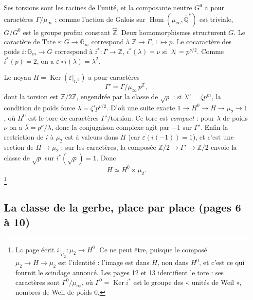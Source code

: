 \documentclass[11pt,a4paper]{article}
\begin{document}
Ses torsions sont les racines de l'unité, et la composante neutre $G^{0}$ a
pour caractères $\Gamma/\mu_{\infty}$ ; comme l'action de Galois sur
$\operatorname{Hom}(\mu_{\infty}, \overline{\mathbb{Q}}^{*})$ est triviale,
$G/G^{0}$ est le groupe profini constant $\widehat{\mathbb{Z}}$. Deux
homomorphismes structurent $G$. Le caractère de Tate
$\varepsilon \colon G \to \mathbb{G}_{m}$ correspond à $\mathbb{Z} \to \Gamma$,
$1 \mapsto p$. Le cocaractère des poids $i \colon \mathbb{G}_{m} \to G$
correspond à $i^{*} \colon \Gamma \to \mathbb{Z}$, $i^{*}(\lambda) = \nu$ si
$|\lambda| = p^{\nu/2}$. Comme $i^{*}(p) = 2$, on a
$\varepsilon \circ i (\lambda) = \lambda^{2}$.

Le noyau $H = \operatorname{Ker}(\varepsilon|_{G^{0}})$ a pour caractères
\[
  \Gamma' = \Gamma / \mu_{\infty}\, p^{\mathbb{Z}} ,
\]
dont la torsion est $\mathbb{Z}/2\mathbb{Z}$, engendrée par la classe de
$\sqrt{p}$ : si $\lambda^{n} = \zeta p^{m}$, la condition de poids force
$\lambda = \zeta' p^{\nu/2}$. D'où une suite exacte $1 \to H^{0} \to H \to
\mu_{2} \to 1$, où $H^{0}$ est le tore de caractères $\Gamma'/\text{torsion}$.
Ce tore est \emph{compact} : pour $\lambda$ de poids $\nu$ on a $\bar{\lambda} =
p^{\nu}/\lambda$, donc la conjugaison complexe agit par $-1$ sur $\Gamma'$.
Enfin la restriction de $i$ à $\mu_{2}$ est à valeurs dans $H$ (car
$\varepsilon(i(-1)) = 1$), et c'est une section de $H \to \mu_{2}$ : sur les
caractères, la composée $\mathbb{Z}/2 \to \Gamma' \to \mathbb{Z}/2$ envoie la
classe de $\sqrt{p}$ sur $i^{*}(\sqrt{p}) = 1$. Donc
\[
  H \simeq H^{0} \times \mu_{2} .
\]
\footnote{La page écrit $i|_{\mu_{2}} \colon \mu_{2} \to H^{0}$. Ce ne peut être,
puisque le composé $\mu_{2} \to H \to \mu_{2}$ est l'identité : l'image est dans
$H$, non dans $H^{0}$, et c'est ce qui fournit le scindage annoncé. Les pages 12
et 13 identifient le tore : ses caractères sont $\Gamma^{0}/\mu_{\infty}$, où
$\Gamma^{0} = \operatorname{Ker} i^{*}$ est le groupe des « unités de Weil »,
nombres de Weil de poids $0$.}

\subsection*{La classe de la gerbe, place par place (pages 6 à 10)}
\end{document}
